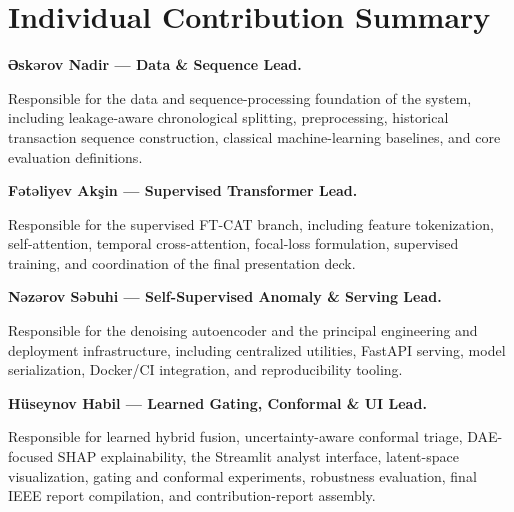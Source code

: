 \documentclass[10pt,a4paper]{article}
\begin{document}
\normalsize

\vspace{8pt}


\section*{\color{darkgreen}Individual Contribution Summary}

\textbf{{\azfont Əskərov Nadir} --- Data \& Sequence Lead.}

Responsible for the data and sequence-processing foundation of the system,
including leakage-aware chronological splitting, preprocessing, historical
transaction sequence construction, classical machine-learning baselines, and
core evaluation definitions.

\vspace{2pt}

\textbf{{\azfont Fətəliyev Akşin} --- Supervised Transformer Lead.}

Responsible for the supervised FT-CAT branch, including feature tokenization,
self-attention, temporal cross-attention, focal-loss formulation, supervised
training, and coordination of the final presentation deck.

\vspace{2pt}

\textbf{{\azfont Nəzərov Səbuhi} --- Self-Supervised Anomaly \& Serving Lead.}

Responsible for the denoising autoencoder and the principal engineering and
deployment infrastructure, including centralized utilities, FastAPI serving,
model serialization, Docker/CI integration, and reproducibility tooling.

\vspace{2pt}

\textbf{{\azfont Hüseynov Habil} --- Learned Gating, Conformal \& UI Lead.}

Responsible for learned hybrid fusion, uncertainty-aware conformal triage,
DAE-focused SHAP explainability, the Streamlit analyst interface, latent-space
visualization, gating and conformal experiments, robustness evaluation, final
IEEE report compilation, and contribution-report assembly.

\vspace{7pt}

\end{document}
